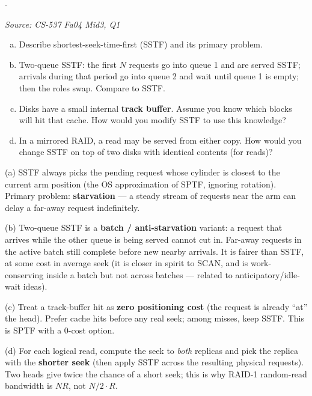 \documentclass[11pt,a4paper]{article}
\makeatletter
\newcommand{\keepspace}[1]{\par\penalty-100\begingroup
  \setlength{\dimen@}{#1}\dimen@ii\pagegoal\advance\dimen@ii-\pagetotal
  \ifdim\dimen@>\dimen@ii\ifdim\dimen@ii>\z@\vfil\fi\break\fi\endgroup}
\newcounter{qn}[section]
\newenvironment{Qn}[4]{%
  \refstepcounter{qn}\keepspace{7\baselineskip}%
  \begin{tcolorbox}[qboxstyle, title={Q\thesection.\theqn\ \ [#1 \textbar\ #2]\ \ #4}]%
  {\footnotesize\color{g3}\textit{Source: #3}}\par\smallskip%
}{%
  \end{tcolorbox}%
}
\newenvironment{Sol}{%
  \begin{tcolorbox}[sboxstyle, title={Solution}]%
}{%
  \end{tcolorbox}\vspace{0.35em}%
}
\makeatother
\begin{document}
\begin{Qn}{Medium-Hard}{Lect 22}{CS-537 Fa04 Mid3, Q1}{SSTF, two-queue SSTF, track buffer, and mirrored SSTF}
\begin{enumerate}[(a)]
\item Describe shortest-seek-time-first (SSTF) and its primary problem.
\item Two-queue SSTF: the first $N$ requests go into queue 1 and are
      served SSTF; arrivals during that period go into queue 2 and wait
      until queue 1 is empty; then the roles swap. Compare to SSTF.
\item Disks have a small internal \textbf{track buffer}. Assume you
      know which blocks will hit that cache. How would you modify SSTF
      to use this knowledge?
\item In a mirrored RAID, a read may be served from either copy. How
      would you change SSTF on top of two disks with identical contents
      (for reads)?
\end{enumerate}
\end{Qn}
\begin{Sol}
(a) SSTF always picks the pending request whose cylinder is closest to
the current arm position (the OS approximation of SPTF, ignoring
rotation). Primary problem: \textbf{starvation} --- a steady stream of
requests near the arm can delay a far-away request indefinitely.

(b) Two-queue SSTF is a \textbf{batch / anti-starvation} variant: a
request that arrives while the other queue is being served cannot cut
in. Far-away requests in the active batch still complete before new
nearby arrivals. It is fairer than SSTF, at some cost in average seek
(it is closer in spirit to SCAN, and is work-conserving inside a batch
but not across batches --- related to anticipatory/idle-wait ideas).

(c) Treat a track-buffer hit as \textbf{zero positioning cost} (the
request is already ``at'' the head). Prefer cache hits before any real
seek; among misses, keep SSTF. This is SPTF with a $0$-cost option.

(d) For each logical read, compute the seek to \emph{both} replicas and
pick the replica with the \textbf{shorter seek} (then apply SSTF across
the resulting physical requests). Two heads give twice the chance of a
short seek; this is why RAID-1 random-read bandwidth is $NR$, not
$N/2\cdot R$.
\end{Sol}
\end{document}
